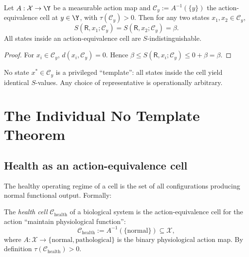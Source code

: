 \documentclass[twocolumn,11pt,a4paper]{article}
\newcommand{\receiver}{\mathsf{R}}
\newcommand{\Cell}{\mathcal{C}}
\newcommand{\X}{\mathcal{X}}
\begin{document}
\begin{theorem}\label{thm:cell-truth}
Let $A:\X\to\Y$ be a measurable action map and
$\Cell_y := A^{-1}(\{y\})$ the action-equivalence cell at $y\in\Y$,
with $\tau(\Cell_y) > 0$. Then for any two states
$x_1, x_2 \in \Cell_y$,
\[
S(\receiver, x_1; \Cell_y) = S(\receiver, x_2; \Cell_y) = \beta.
\]
All states inside an action-equivalence cell are $S$-indistinguishable.
\end{theorem}

\begin{proof}
For $x_i \in \Cell_y$, $d(x_i, \Cell_y) = 0$. Hence
$\beta \leq S(\receiver, x_i; \Cell_y) \leq 0 + \beta = \beta$.
\end{proof}

\begin{corollary}\label{cor:no-rep}
No state $x^* \in \Cell_y$ is a privileged ``template'': all states inside
the cell yield identical $S$-values. Any choice of representative is
operationally arbitrary.
\end{corollary}

\section{The Individual No Template Theorem}
\label{sec:individual}

\subsection{Health as an action-equivalence cell}

The healthy operating regime of a cell is the set of all configurations
producing normal functional output. Formally:

\begin{definition}\label{def:health-cell}
The \emph{health cell} $\Cell_{\mathrm{health}}$ of a biological system is
the action-equivalence cell for the action ``maintain physiological function'':
\[
\Cell_{\mathrm{health}} := A^{-1}(\{\text{normal}\}) \subseteq \X,
\]
where $A:\X\to\{\text{normal},\text{pathological}\}$ is the binary
physiological action map. By definition $\tau(\Cell_{\mathrm{health}}) > 0$.
\end{definition}
\end{document}
